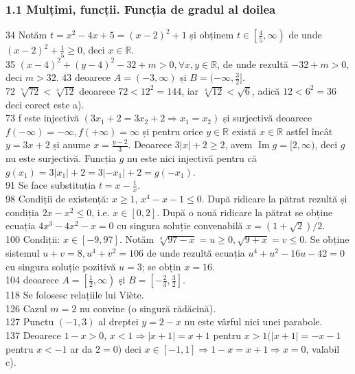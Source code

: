 \documentclass[11pt]{article}
\begin{document}
\subsubsection*{1.1 Mulțimi, funcții. Funcția de gradul al doilea}
34 Notăm $t=x^{2}-4 x+5=(x-2)^{2}+1$ și obținem $t \in\left[\frac{4}{5}, \infty\right)$ de unde $(x-2)^{2}+\frac{1}{5} \geq 0$, deci $x \in \mathbb{R}$.\\
35 $(x-4)^{2}+(y-4)^{2}-32+m>0, \forall x, y \in \mathbb{R}$, de unde rezultă $-32 + m > 0$, deci $m>32$. 43 deoarece $A=(-3, \infty)$ și $B=(-\infty, \frac{3}{2}]$.\\
72 $\sqrt[5]{72}<\sqrt[4]{12}$ deoarece $72<12^{2}=144$, iar $\sqrt[4]{12}<\sqrt{6}$, adică $12<6^{2}=36$ deci corect este a).\\
73 f este injectivă $\left(3 x_{1}+2=3 x_{2}+2 \Rightarrow x_{1}=x_{2}\right)$ și surjectivă deoarece $f(-\infty)=-\infty, f(+\infty)=\infty$ și pentru orice $y \in \mathbb{R}$ există $x \in \mathbb{R}$ astfel încât $y=3 x+2$ și anume $x=\frac{y-2}{3}$. Deoarece $3|x|+2 \geq 2$, avem $\operatorname{Im} g=[2, \infty)$, deci $g$ nu este surjectivă. Funcția $g$ nu este nici injectivă pentru că $g\left(x_{1}\right)=3\left|x_{1}\right|+2=3\left|-x_{1}\right|+2=g\left(-x_{1}\right)$.\\
91 Se face substituția $t=x-\frac{1}{x}$.\\
98 Condiții de existență: $x \geq 1$, $x^{4}-x-1 \leq 0$. După ridicare la pătrat rezultă și condiția $2 x-x^{2} \leq 0$, i.e. $x \in[0,2]$. După o nouă ridicare la pătrat se obține ecuația $4 x^{3}-4 x^{2}-x=0$ cu singura soluție convenabilă $x=(1+\sqrt{2}) / 2$.\\
100 Condiții: $x \in[-9,97]$. Notăm $\sqrt[4]{97-x}=u \geq 0, \sqrt{9+x}=v \leq 0$. Se obține sistemul $u+v=8, u^{4}+v^{2}=106$ de unde rezultă ecuația $u^{4}+u^{2}-16 u-42=0$ cu singura soluție pozitivă $u=3$; se obțin $x=16$.\\
104 deoarece $A=\left[\frac{1}{2}, \infty\right)$ și $B=\left[-\frac{2}{3}, \frac{3}{2}\right]$.\\
118 Se folosesc relațiile lui Viète.\\
126 Cazul $m=2$ nu convine (o singură rădăcină).\\
127 Punctu $(-1,3)$ al dreptei $y=2-x$ nu este vârful nici unei parabole.\\
137 Deoarece $1-x>0$, $x<1 \Rightarrow|x+1|=x+1$ pentru $x>1(|x+1|=-x-1$ pentru $x<-1$ ar da $2=0$) deci $x \in[-1,1] \Rightarrow 1-x=x+1 \Rightarrow x=0$, valabil c).\\
\end{document}
